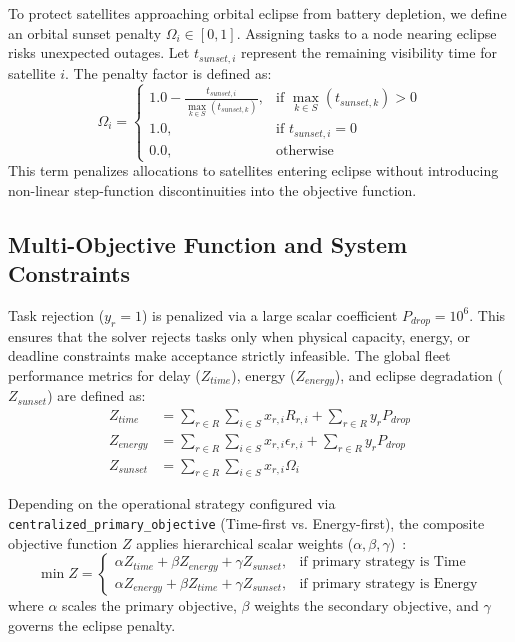 To protect satellites approaching orbital eclipse from battery depletion, we define an orbital sunset penalty $\Omega_i \in [0, 1]$. 
Assigning tasks to a node nearing eclipse risks unexpected outages. 
Let $t_{sunset,i}$ represent the remaining visibility time for satellite $i$. The penalty factor is defined as:
\begin{equation}
    \Omega_i = \begin{cases}
        1.0 - \frac{t_{sunset,i}}{\max_{k \in S} (t_{sunset,k})}, & \text{if } \max_{k \in S} (t_{sunset,k}) > 0 \\
        1.0, & \text{if } t_{sunset,i} = 0 \\
        0.0, & \text{otherwise}
    \end{cases}
\end{equation}
This term penalizes allocations to satellites entering eclipse without introducing non-linear step-function discontinuities into the objective function.

\subsection{Multi-Objective Function and System Constraints}
\label{subsec:objective_constraints}

Task rejection ($y_r = 1$) is penalized via a large scalar coefficient $P_{drop} = 10^6$. 
This ensures that the solver rejects tasks only when physical capacity, energy, or deadline constraints make acceptance strictly infeasible. 
The global fleet performance metrics for delay ($Z_{time}$), energy ($Z_{energy}$), and eclipse degradation ($Z_{sunset}$) are defined as:
\begin{align}
    Z_{time} &= \sum_{r \in R} \sum_{i \in S} x_{r,i} R_{r,i} + \sum_{r \in R} y_r P_{drop} \\
    Z_{energy} &= \sum_{r \in R} \sum_{i \in S} x_{r,i} \epsilon_{r,i} + \sum_{r \in R} y_r P_{drop} \\
    Z_{sunset} &= \sum_{r \in R} \sum_{i \in S} x_{r,i} \Omega_i
\end{align}

Depending on the operational strategy configured via \texttt{centralized\_primary\_objective} (Time-first vs. Energy-first), the composite objective function $Z$ applies hierarchical scalar weights ($\alpha, \beta, \gamma$)~\cite{boyd2004convex, zhong2025leo}:
\begin{equation}
    \min Z = \begin{cases}
        \alpha Z_{time} + \beta Z_{energy} + \gamma Z_{sunset}, & \text{if primary strategy is Time} \\
        \alpha Z_{energy} + \beta Z_{time} + \gamma Z_{sunset}, & \text{if primary strategy is Energy}
    \end{cases}
    \label{eq:objective_function}
\end{equation}
where $\alpha$ scales the primary objective, $\beta$ weights the secondary objective, and $\gamma$ governs the eclipse penalty.

